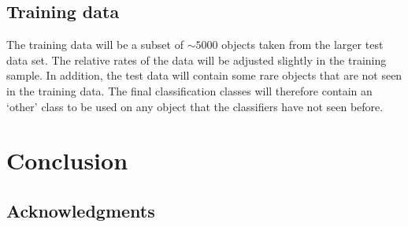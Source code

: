 \documentclass[\docopts]{\docclass}
\begin{document}
\subsection{Training data}
The training data will be a subset of $\sim 5000$ objects taken from the larger test data set. The relative rates of the data will be adjusted slightly in the training sample. In addition, the test data will contain some rare objects that are not seen in the training data. The final classification classes will therefore contain an `other' class to be used on any object that the classifiers have not seen before.



\section{Conclusion}
\label{sec:conclusion}




\subsection*{Acknowledgments}










%
\end{document}
